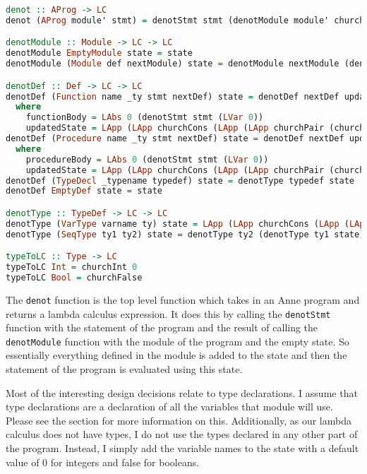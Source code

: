 \begin{lstlisting}[language=Haskell]
denot :: AProg -> LC
denot (AProg module' stmt) = denotStmt stmt (denotModule module' churchNil)

denotModule :: Module -> LC -> LC
denotModule EmptyModule state = state
denotModule (Module def nextModule) state = denotModule nextModule (denotDef def state)

denotDef :: Def -> LC -> LC
denotDef (Function name _ty stmt nextDef) state = denotDef nextDef updatedState
  where
    functionBody = LAbs 0 (denotStmt stmt (LVar 0))
    updatedState = LApp (LApp churchCons (LApp (LApp churchPair (churchNum name)) functionBody)) state
denotDef (Procedure name _ty stmt nextDef) state = denotDef nextDef updatedState
  where
    procedureBody = LAbs 0 (denotStmt stmt (LVar 0))
    updatedState = LApp (LApp churchCons (LApp (LApp churchPair (churchNum name)) procedureBody)) state
denotDef (TypeDecl _typename typedef) state = denotType typedef state
denotDef EmptyDef state = state

denotType :: TypeDef -> LC -> LC
denotType (VarType varname ty) state = LApp (LApp churchCons (LApp (LApp churchPair (churchNum varname)) (typeToLC ty))) state
denotType (SeqType ty1 ty2) state = denotType ty2 (denotType ty1 state)

typeToLC :: Type -> LC
typeToLC Int = churchInt 0
typeToLC Bool = churchFalse
\end{lstlisting}

The \texttt{denot} function is the top level function which takes in an Anne
program and returns a lambda calculus expression. It does this by calling the
\texttt{denotStmt} function with the statement of the program and the result of
calling the \texttt{denotModule} function with the module of the program and
the empty state. So essentially everything defined in the module is added to
the state and then the statement of the program is evaluated using this state.

Most of the interesting design decisions relate to type declarations. I assume
that type declarations are a declaration of all the variables that module will
use. Please see the  section for more information on this.
Additionally, as our lambda calculus does not have types, I do not use
the types declared in any other part of the program. Instead, I simply add the variable names to the state
with a default value of 0 for integers and false for booleans.

